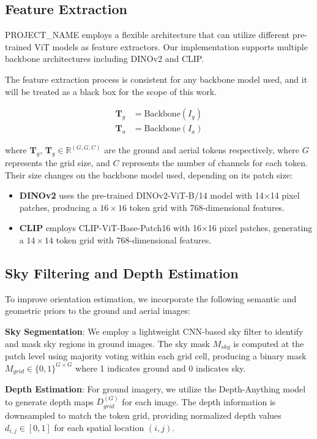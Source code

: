 \documentclass{bmvc2k}
\begin{document}
\subsection{Feature Extraction}

PROJECT\_NAME employs a flexible architecture that can utilize different pre-trained ViT models as feature extractors. Our implementation supports multiple backbone architectures including DINOv2 and CLIP.

The feature extraction process is consistent for any backbone model used, and it will be treated as a black box for the scope of this work.

\begin{align}
\mathbf{T}_g &= \text{Backbone}(I_g) \\
\mathbf{T}_a &= \text{Backbone}(I_a) 
\end{align}

where $\mathbf{T}_g$, $\mathbf{T}_g \in \mathbb{R}^{(G, G, C)}$ are the ground and aerial tokens respectively, where $G$ represents the grid size, and $C$ represents the number of channels for each token. Their size changes on the backbone model used, depending on its patch size:

\begin{itemize}
    \item \textbf{DINOv2} uses the pre-trained DINOv2-ViT-B/14 model with 14×14 pixel patches, producing a $16 \times 16$ token grid with 768-dimensional features.
    \item \textbf{CLIP} employs CLIP-ViT-Base-Patch16 with 16×16 pixel patches, generating a $14 \times 14$ token grid with 768-dimensional features.
\end{itemize}

\subsection{Sky Filtering and Depth Estimation}

To improve orientation estimation, we incorporate the following semantic and geometric priors to the ground and aerial images:

\textbf{Sky Segmentation}: We employ a lightweight CNN-based sky filter to identify and mask sky regions in ground images. The sky mask $M_{sky}$ is computed at the patch level using majority voting within each grid cell, producing a binary mask $M_{grid} \in \{0,1\}^{G \times G}$ where 1 indicates ground and 0 indicates sky.

\textbf{Depth Estimation}: For ground imagery, we utilize the Depth-Anything model to generate depth maps $D^{(G)}_{grid}$ for each image. The depth information is downsampled to match the token grid, providing normalized depth values $d_{i,j} \in [0,1]$ for each spatial location $(i,j)$.
\end{document}
